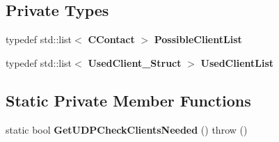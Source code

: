 \subsection*{Private Types}
\begin{DoxyCompactItemize}
\item 
typedef std::list$<$ {\bf CContact} $>$ {\bfseries PossibleClientList}\label{classKademlia_1_1CUDPFirewallTester_a8b8e4c577d57b22f2f2b9b08783eebd1}

\item 
typedef std::list$<$ {\bf UsedClient\_\-Struct} $>$ {\bfseries UsedClientList}\label{classKademlia_1_1CUDPFirewallTester_a33c67a8ef89e4889a4875ae7a8d20c2e}

\end{DoxyCompactItemize}
\subsection*{Static Private Member Functions}
\begin{DoxyCompactItemize}
\item 
static bool {\bfseries GetUDPCheckClientsNeeded} ()  throw ()\label{classKademlia_1_1CUDPFirewallTester_a45fe2bd37e146d50bc2019fd3194f911}

\end{DoxyCompactItemize}
